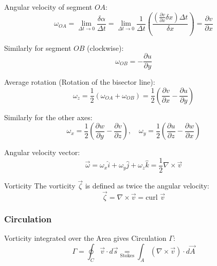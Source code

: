 Angular velocity of segment $OA$:
$$ \omega_{OA} = \lim_{\Delta t \to 0} \frac{\delta \alpha}{\Delta t} = \lim_{\Delta t \to 0} \frac{1}{\Delta t} \left( \frac{(\frac{\partial v}{\partial x} \delta x) \Delta t}{\delta x} \right) = \frac{\partial v}{\partial x} $$

Similarly for segment $OB$ (clockwise):
$$ \omega_{OB} = -\frac{\partial u}{\partial y} $$

Average rotation (Rotation of the bisector line):
$$ \omega_z = \frac{1}{2} (\omega_{OA} + \omega_{OB}) = \frac{1}{2} \left( \frac{\partial v}{\partial x} - \frac{\partial u}{\partial y} \right) $$

Similarly for the other axes:
$$ \omega_x = \frac{1}{2} \left( \frac{\partial w}{\partial y} - \frac{\partial v}{\partial z} \right), \quad \omega_y = \frac{1}{2} \left( \frac{\partial u}{\partial z} - \frac{\partial w}{\partial x} \right) $$

Angular velocity vector:
$$ \vec{\omega} = \omega_x \hat{i} + \omega_y \hat{j} + \omega_z \hat{k} = \frac{1}{2} \nabla \times \vec{v} $$

\begin{defbox}{Vorticity}
The vorticity $\vec{\zeta}$ is defined as twice the angular velocity:
$$ \vec{\zeta} = \nabla \times \vec{v} = \text{curl } \vec{v} $$
\end{defbox}

\subsubsection{Circulation}

\begin{center}
\end{center}

Vorticity integrated over the Area gives Circulation $\Gamma$:
$$ \Gamma = \oint_C \vec{v} \cdot d\vec{s} \underset{\text{Stokes}}{=} \int_A (\nabla \times \vec{v}) \cdot d\vec{A} $$

